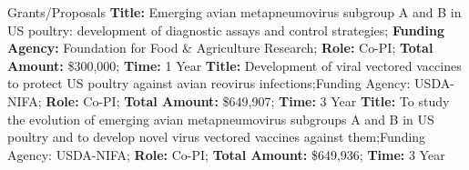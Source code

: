 \begin{rubric}{Grants/Proposals}
\entrya[] \textbf{Title:} Emerging avian metapneumovirus subgroup A and B in US poultry: development of diagnostic assays and control strategies; \textbf{Funding Agency:} Foundation for Food \& Agriculture Research; \textbf{Role:} Co-PI; \textbf{Total Amount:} \$300,000; \textbf{Time:} 1 Year
\entrya[] \textbf{Title:} Development of viral vectored vaccines to protect US poultry against avian reovirus infections;{Funding Agency:} USDA-NIFA; \textbf{Role:} Co-PI; \textbf{Total Amount:} \$649,907; \textbf{Time:} 3 Year
\entrya[] \textbf{Title:} To study the evolution of emerging avian metapneumovirus subgroups A and B in US poultry and to develop novel virus vectored vaccines against them;{Funding Agency:} USDA-NIFA; \textbf{Role:} Co-PI; \textbf{Total Amount:} \$649,936; \textbf{Time:} 3 Year
\end{rubric}